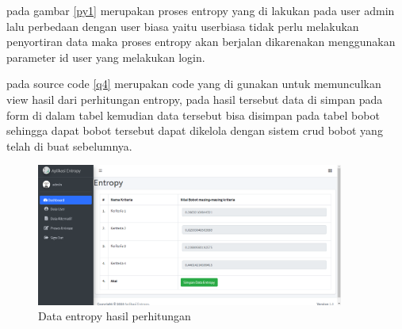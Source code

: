pada gambar \ref{py1} merupakan proses entropy yang di lakukan pada user admin lalu perbedaan dengan user biasa yaitu userbiasa tidak perlu melakukan penyortiran data maka proses entropy akan berjalan dikarenakan menggunakan parameter id user yang melakukan login.
\pagebreak



pada source code \ref{q4} merupakan code yang di gunakan untuk memunculkan view hasil dari perhitungan entropy, pada hasil tersebut data di simpan pada form di dalam tabel kemudian data tersebut bisa disimpan pada tabel bobot sehingga dapat bobot tersebut dapat dikelola dengan sistem crud bobot yang telah di buat sebelumnya.
\begin{figure}[!htbp]
	\centerline{\includegraphics[width=0.90\textwidth]{figures/en/2.png}}
	\caption{Data entropy hasil perhitungan}
	\label{py2}
\end{figure}


